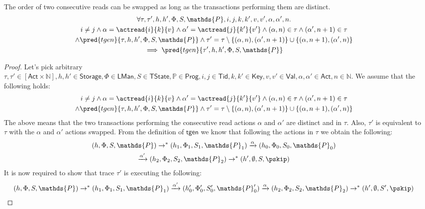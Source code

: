 \begin{lem}
	\label{lem:rr}
	The order of two consecutive reads can be swapped as long as the transactions performing them are distinct.
	\begin{gather*}
		\forall \tau, \tau', h, h', \Phi, S, \mathds{P}, i, j, k, k', v, v', \alpha, \alpha', n \ldotp \\
		i \neq j \land \alpha = \actread{i}{k}{v} \land \alpha' = \actread{j}{k'}{v'} \land (\alpha, n) \in \tau \land (\alpha', n+1) \in \tau \\ \land \pred{tgen}{\tau, h, h', \Phi, S, \mathds{P}} \land \tau' = \tau \setminus \{(\alpha, n), (\alpha', n+1)\} \cup \{ (\alpha, n+1), (\alpha', n) \}
			\\	 
		 \implies \pred{tgen}{\tau', h, h', \Phi, S, \mathds{P}}
	\end{gather*}
	\begin{proof}
	Let's pick arbitrary $\tau, \tau' \in [\mathsf{Act} \times \mathds{N}], h, h' \in \mathsf{Storage}, \Phi \in \mathsf{LMan}, S \in \mathsf{TState}, \mathds{P} \in \mathsf{Prog}, i, j \in \mathsf{Tid}, k, k' \in \mathsf{Key}, v, v' \in \mathsf{Val}, \alpha, \alpha' \in \mathsf{Act}, n \in \mathds{N}$. We assume that the following holds:
	\begin{gather*}
		i \neq j \land \alpha = \actread{i}{k}{v} \land \alpha' = \actread{j}{k'}{v'} \land (\alpha, n) \in \tau \land (\alpha', n+1) \in \tau \\ \land \pred{tgen}{\tau, h, h', \Phi, S, \mathds{P}} \land \tau' = \tau \setminus \{(\alpha, n), (\alpha', n+1)\} \cup \{ (\alpha, n+1), (\alpha', n) \}
	\end{gather*}
	The above means that the two transactions performing the consecutive read actions $\alpha$ and $\alpha'$ are distinct and in $\tau$. Also, $\tau'$ is equivalent to $\tau$ with the $\alpha$ and $\alpha'$ actions swapped. From the definition of $\mathsf{tgen}$ we know that following the actions in $\tau$ we obtain the following:
	\begin{gather}
		\label{lem:rr1} (h, \Phi, S, \mathds{P}) \rightarrow^* (h_1, \Phi_1, S_1, \mathds{P}_1) \xrightarrow{\alpha} (h_0, \Phi_0, S_0, \mathds{P}_0) \\
		\label{lem:rr2} \xrightarrow{\alpha'} (h_2, \Phi_2, S_2, \mathds{P}_2) \rightarrow^* (h', \emptyset, S, \pskip)
	\end{gather}
	It is now required to show that trace $\tau'$ is executing the following:
	\[
		(h, \Phi, S, \mathds{P}) \rightarrow^* (h_1, \Phi_1, S_1, \mathds{P}_1) \xrightarrow{\alpha'} (h_0', \Phi_0', S_0', \mathds{P}_0') \xrightarrow{\alpha} (h_2, \Phi_2, S_2, \mathds{P}_2) \rightarrow^* (h', \emptyset, S', \pskip)
\]
\end{proof}
\end{lem}
